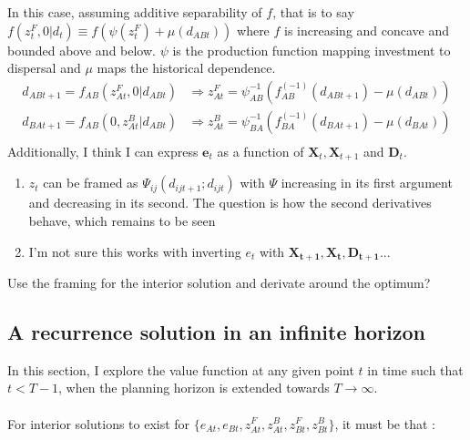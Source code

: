 \documentclass{article}
\begin{document}
In this case, assuming additive separability of $f$, that is to say
$ f(z_t^F, 0|d_t) \equiv f \left(  \psi (z_t^F) + \mu (d_{ABt} ) \right) $ where $f$ is increasing and concave and bounded above and below. $\psi$ is the production function mapping investment to dispersal and $\mu$ maps the historical dependence. 
\begin{align*}
d_{ABt+1} = f_{AB}(z_{At}^F, 0| d_{ABt}) & \Rightarrow z_{At}^F = \psi_{AB}^{-1}\left( f_{AB}^{(-1)}(d_{ABt+1}) - \mu(d_{ABt})\right) \\
d_{BAt+1} = f_{AB}(0, z_{At}^B| d_{ABt})& \Rightarrow z_{At}^B =\psi_{BA}^{-1} \left( f_{BA}^{(-1)}(d_{BAt+1}) - \mu(d_{BAt}) \right)\\
\end{align*}
Additionally, I think I can express $\mathbf{e}_t$ as a function of $\mathbf{X}_t, \mathbf{X}_{t+1}$ and $\mathbf{D}_t$.

\begin{enumerate}
	\item $z_t$ can be framed as $\Psi_{ij}(d_{ijt+1}; d_{ijt})$ with $\Psi$ increasing in its first argument and decreasing in its second. The question is how the second derivatives behave, which remains to be seen
	\item I'm not sure this works with inverting $e_t$ with $\mathbf{X_{t+1}, X_t, D_{t+1}}$...
\end{enumerate}

Use the framing for the interior solution and derivate around the optimum? \\


\subsection{A recurrence solution in an infinite horizon}
In this section, I explore the value function at any given point $t$ in time such that $t<T-1$, when the planning horizon is extended towards $T \to \infty$.
\\\\
For interior solutions to exist for $\{e_{At}, e_{Bt}, z_{At}^F, z_{At}^B, z_{Bt}^F, z_{Bt}^B\}$, it must be that : 
\end{document}
